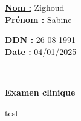 \documentclass[12pt,a4paper]{article}%
\begin{document}
%
\normalsize%
\begin{minipage}{0.5\linewidth}%
\textbf{\underline{Nom :}} \hspace{1cm} Zighoud%
\\%
\textbf{\underline{Prénom :}} \hspace{1cm} Sabine%
\\%
\end{minipage}%
\begin{minipage}{0.5\linewidth}%
\textbf{\underline{DDN :}} \hspace{1cm} 26-08-1991%
\\%
\textbf{\underline{Date :}} \hspace{1cm} 04/01/2025%
\\%
\end{minipage}%
\hspace{\textwidth}%
\\%
\begin{center}%

        \begin{tcolorbox}[
            colframe=main_title_border_color,        %
            colback=main_title_background_color,        %
            coltitle=main_title_border_color,       %
            arc=8pt,              %
            boxrule=0.5mm,          %
            auto outer arc,       %
            width=\linewidth,     %
            halign=center         %
        ]
        \LARGE{\textbf{Examen clinique}}
        \end{tcolorbox}
\end{center}%
%
\vspace*{\baselineskip}%
\hspace*{7.0cm}%
test%
\\%
%
\vspace*{\baselineskip}%
\end{document}
